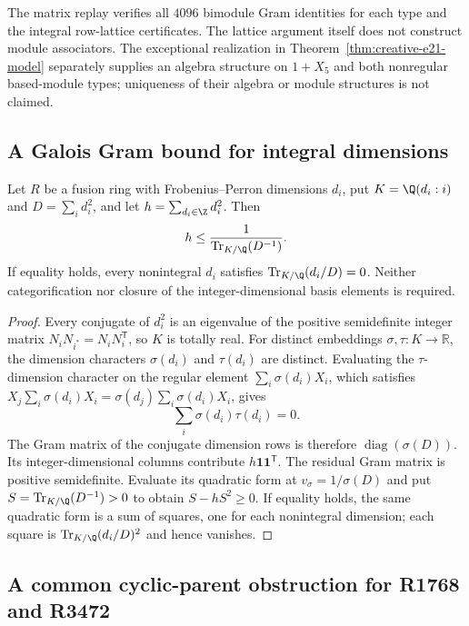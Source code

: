 The matrix replay verifies all $4096$ bimodule Gram identities for
each type and the integral row-lattice certificates. The lattice argument itself does not construct module associators.
The exceptional realization in Theorem~\ref{thm:creative-e21-model}
separately supplies an algebra structure on $1+X_5$ and both
nonregular based-module types; uniqueness of their algebra or module
structures is not claimed.

\subsection{A Galois Gram bound for integral dimensions}
\label{subsec:creative-r3472-gram}

\begin{lemma}
\label{lem:creative-galois-gram}
Let $R$ be a fusion ring with Frobenius--Perron dimensions $d_i$, put
$K=\Q(d_i:i)$ and $D=\sum_i d_i^2$, and let
$h=\sum_{d_i\in\Z}d_i^2$. Then
\[
 h\leq \frac1{\operatorname{Tr}_{K/\Q}(D^{-1})}.
\]
If equality holds, every nonintegral $d_i$ satisfies
$\operatorname{Tr}_{K/\Q}(d_i/D)=0$.
Neither categorification nor closure of the integer-dimensional basis
elements is required.
\end{lemma}
\begin{proof}
Every conjugate of $d_i^2$ is an eigenvalue of the positive semidefinite
integer matrix $N_iN_{i^*}=N_iN_i^{\mathsf T}$, so $K$ is totally real.
For distinct embeddings $\sigma,\tau:K\longrightarrow\mathbb R$, the
dimension characters $\sigma(d_i)$ and $\tau(d_i)$ are distinct.
Evaluating the $\tau$-dimension character on the regular element
$\sum_i\sigma(d_i)X_i$, which satisfies
$X_j\sum_i\sigma(d_i)X_i=\sigma(d_j)\sum_i\sigma(d_i)X_i$, gives
\[
 \sum_i\sigma(d_i)\tau(d_i)=0.
\]
The Gram matrix of the conjugate dimension rows is therefore
$\operatorname{diag}(\sigma(D))$. Its integer-dimensional columns
contribute $h\mathbf1\mathbf1^{\mathsf T}$. The residual Gram matrix
is positive semidefinite. Evaluate its quadratic form at
$v_\sigma=1/\sigma(D)$ and put
$S=\operatorname{Tr}_{K/\Q}(D^{-1})>0$ to obtain $S-hS^2\geq0$.
If equality holds, the same quadratic form is a sum of squares, one
for each nonintegral dimension; each square is
$\operatorname{Tr}_{K/\Q}(d_i/D)^2$ and hence vanishes.
\end{proof}

\subsection{A common cyclic-parent obstruction for R1768 and R3472}
\label{subsec:creative-cyclic-parent}


